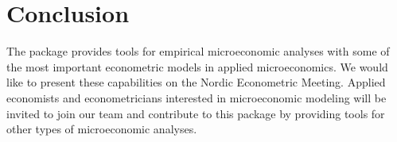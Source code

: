 \section{Conclusion}

The  package provides tools for empirical microeconomic analyses
with some of the most important econometric models in applied microeconomics.
We would like to present these capabilities on the Nordic Econometric Meeting.
Applied economists and econometricians interested in microeconomic modeling
will be invited to join our team and contribute to this package
by providing tools for other types of microeconomic analyses.

